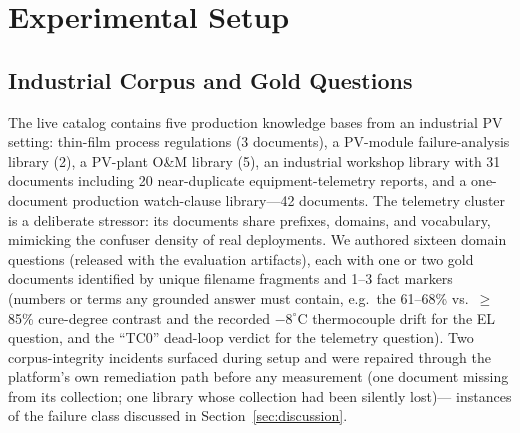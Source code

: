 \documentclass[journal]{IEEEtran}
\begin{document}
\section{Experimental Setup}
\label{sec:setup}

\subsection{Industrial Corpus and Gold Questions}
The live catalog contains five production knowledge bases from an
industrial PV setting: thin-film process regulations (3 documents), a
PV-module failure-analysis library (2), a PV-plant O\&M library (5), an
industrial workshop library with 31 documents including 20 near-duplicate
equipment-telemetry reports, and a one-document production watch-clause
library---42 documents. The telemetry cluster is a deliberate stressor:
its documents share prefixes, domains, and vocabulary, mimicking the
confuser density of real deployments. We authored sixteen domain
questions (released with the evaluation artifacts), each with one or two
gold documents identified by unique filename fragments and 1--3 fact
markers (numbers or terms any grounded answer must contain, e.g.\ the
61--68\% vs.\ $\geq$85\% cure-degree contrast and the recorded
$-8^\circ$C thermocouple drift for the EL question, and the ``TC0''
dead-loop verdict for the telemetry question). Two corpus-integrity
incidents surfaced during setup and were repaired through the platform's
own remediation path before any measurement (one document missing from
its collection; one library whose collection had been silently lost)---
instances of the failure class discussed in
Section~\ref{sec:discussion}.
\end{document}
